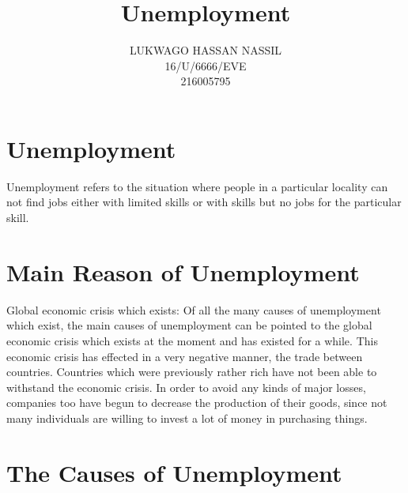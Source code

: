 \documentclass[8pt]{article}
\title{Unemployment}
\author{LUKWAGO HASSAN NASSIL\\
16/U/6666/EVE\\
216005795
}
\date{}
\begin{document}
\maketitle

\section*{Unemployment}

Unemployment refers to the situation where people in a particular locality can not find jobs either with limited skills or with skills but no jobs for the particular skill.

\section{Main Reason of Unemployment}
Global economic crisis which exists: Of all the many causes of unemployment which exist, the main causes of unemployment   can be pointed to the global economic crisis which exists at the moment and has existed for a while.
This economic crisis has effected in a very negative manner, the trade between countries. Countries which were previously rather rich have not been able to withstand the economic crisis.
In order to avoid any kinds of major losses, companies too have begun to decrease the production of their goods, since not many individuals are willing to invest a lot of money in purchasing things.


\section{The Causes of Unemployment}
\end{document}

